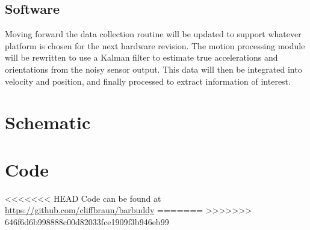 \documentclass[11pt,oneside]{amsart}
\begin{document}
\subsection{Software}
Moving forward the data collection routine will be updated to support whatever platform is chosen for the next hardware revision. The motion processing module will be rewritten to use a Kalman filter to estimate true accelerations and orientations from the noisy sensor output. This data will then be integrated into velocity and position, and finally processed to extract information of interest. 
\newpage
\begin{appendix}
\section{Schematic}
\label{sec:schematic}

\section{Code}
<<<<<<< HEAD
Code can be found at \url{https://github.com/cliffbraun/barbuddy}
=======
>>>>>>> 646f6d6b998888c00d82033fce1909f3b946eb99


\end{appendix}
\end{document}
